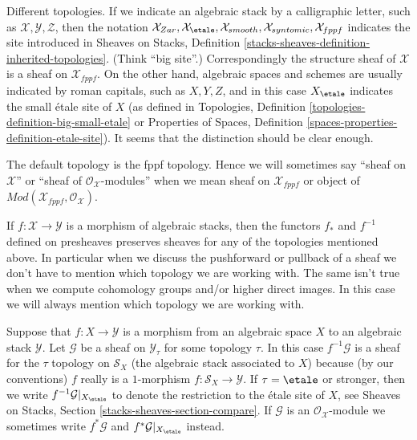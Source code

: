 \noindent
Different topologies. If we indicate an algebraic stack by a calligraphic
letter, such as $\mathcal{X}, \mathcal{Y}, \mathcal{Z}$, then the notation
$\mathcal{X}_{Zar}, \mathcal{X}_\etale, \mathcal{X}_{smooth},
\mathcal{X}_{syntomic}, \mathcal{X}_{fppf}$ indicates the site introduced
in
Sheaves on Stacks, Definition
\ref{stacks-sheaves-definition-inherited-topologies}.
(Think ``big site''.) Correspondingly the structure sheaf of
$\mathcal{X}$ is a sheaf on $\mathcal{X}_{fppf}$.
On the other hand, algebraic spaces and schemes
are usually indicated by roman capitals, such as $X, Y, Z$, and in this case
$X_\etale$ indicates the small \'etale site of $X$ (as
defined in
Topologies, Definition
\ref{topologies-definition-big-small-etale}
or
Properties of Spaces, Definition
\ref{spaces-properties-definition-etale-site}).
It seems that the distinction should be clear enough.

\medskip\noindent
The default topology is the fppf topology. Hence we will sometimes
say ``sheaf on $\mathcal{X}$'' or ``sheaf of $\mathcal{O}_\mathcal{X}$-modules''
when we mean sheaf on $\mathcal{X}_{fppf}$ or object of
$\textit{Mod}(\mathcal{X}_{fppf}, \mathcal{O}_\mathcal{X})$.

\medskip\noindent
If $f : \mathcal{X} \to \mathcal{Y}$ is a morphism of algebraic
stacks, then the functors $f_*$ and $f^{-1}$ defined on presheaves
preserves sheaves for any of the topologies mentioned above. In particular
when we discuss the pushforward or pullback of a sheaf we don't have to
mention which topology we are working with. The same isn't true
when we compute cohomology groups and/or higher direct images. In this
case we will always mention which topology we are working with.

\medskip\noindent
Suppose that $f : X \to \mathcal{Y}$ is a morphism from an algebraic
space $X$ to an algebraic stack $\mathcal{Y}$. Let $\mathcal{G}$ be
a sheaf on $\mathcal{Y}_\tau$ for some topology $\tau$. In this case
$f^{-1}\mathcal{G}$ is a sheaf for the $\tau$ topology on $\mathcal{S}_X$
(the algebraic stack associated to $X$) because (by our conventions) $f$
really is a $1$-morphism $f : \mathcal{S}_X \to \mathcal{Y}$.
If $\tau = \etale$ or stronger, then we write
$f^{-1}\mathcal{G}|_{X_\etale}$
to denote the restriction to the \'etale site of $X$, see
Sheaves on Stacks, Section \ref{stacks-sheaves-section-compare}.
If $\mathcal{G}$ is an $\mathcal{O}_\mathcal{X}$-module we sometimes
write $f^*\mathcal{G}$ and $f^*\mathcal{G}|_{X_\etale}$
instead.




